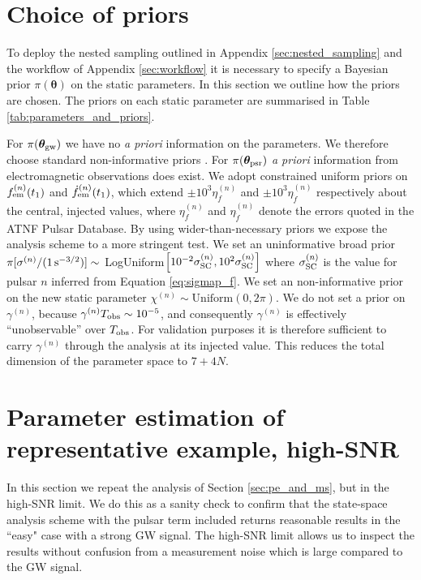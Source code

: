 \documentclass[fleqn,usenatbib,useAMS]{mnras}
\begin{document}
\section{Choice of priors}\label{sec:set_priors}
To deploy the nested sampling outlined in Appendix \ref{sec:nested_sampling} and the workflow of Appendix \ref{sec:workflow} it is necessary to specify a Bayesian prior $\pi(\boldsymbol{\theta})$ on the static parameters. In this section we outline how the priors are chosen. The priors on each static parameter are summarised in Table \ref{tab:parameters_and_priors}.  \newline 

For $\pi(\boldsymbol{\theta}_{\rm gw})$ we have no \textit{a priori} information on the parameters. We therefore choose standard non-informative priors \citep[e.g.][]{Bhagwat2021}. For $\pi(\boldsymbol{\theta}_{\rm psr})$ \textit{a priori} information from electromagnetic observations does exist. We adopt constrained uniform priors on $f_{\rm em}^{(n)}(t_1)$ and $\dot{f}_{\rm em}^{(n)}(t_1)$, which extend $\pm 10^3 \eta_f^{(n)}$ and $\pm 10^3 \eta_{\dot{f}}^{(n)}$ respectively about the central, injected values, where $\eta_f^{(n)}$ and $\eta_{\dot{f}}^{(n)}$ denote the errors quoted in the ATNF Pulsar Database. By using wider-than-necessary priors we expose the analysis scheme to a more stringent test. We set an uninformative broad prior $\pi[\sigma^{(n)} / (1 \, {\rm s^{-3/2}})] \sim$ LogUniform$ \left [10^{-2} \sigma_{\rm SC}^{(n)}, 10^2 \sigma_{\rm SC}^{(n)} \right ]$
where $\sigma_{\rm SC}^{(n)}$ is the value for pulsar $n$ inferred from
Equation \eqref{eq:sigmap_f}. We set an non-informative prior on the new static parameter $\chi^{(n)} \sim \text{Uniform}\left(0,2\pi\right)$. We do not set a prior on $\gamma^{(n)}$, because $\gamma^{(n)} T_{\rm obs} \sim 10^{-5}$, and consequently $\gamma^{(n)}$ is effectively ``unobservable'' over $T_{\rm obs}$. For validation purposes it is therefore sufficient to carry $\gamma^{(n)}$ through the analysis at its injected value. This reduces the total dimension of the parameter space to $7 + 4N$. \newline 













\section{Parameter estimation of representative example,  high-SNR} \label{sec:app_high_SNR}
In this section we repeat the analysis of Section \ref{sec:pe_and_ms}, but in the high-SNR limit. We do this as a sanity check to confirm that the state-space analysis scheme with the pulsar term included returns reasonable results in the ``easy" case with a strong GW signal. The high-SNR limit allows us to inspect the results without confusion from a measurement noise which is large compared to the GW signal. \newline 
\end{document}
